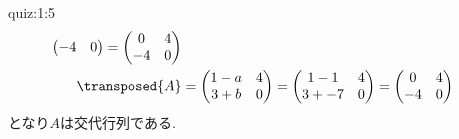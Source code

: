 \begin{answerof}{quiz:1:5}
\begin{align*}
\begin{pmatrix}
      -4  &0
    \end{pmatrix}
    =
    \begin{pmatrix}
      0& 4\\
      -4  &0
    \end{pmatrix}\\    
    \transposed{A}&=
    \begin{pmatrix}
      1-a& 4\\
      3+b &0
    \end{pmatrix}
    =
      \begin{pmatrix}
      1-1& 4\\
      3+-7 &0
    \end{pmatrix}
    =
      \begin{pmatrix}
      0& 4\\
      -4 &0
    \end{pmatrix}
\end{align*}
となり$A$は交代行列である.  
\end{answerof}


